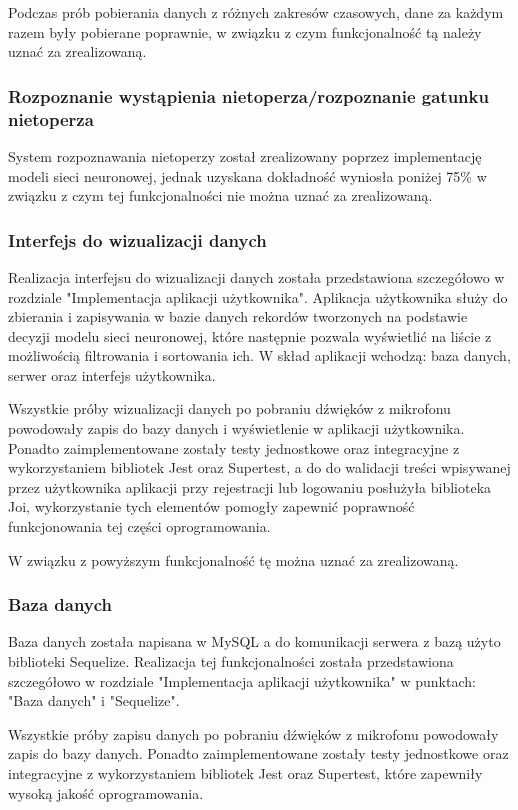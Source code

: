 \documentclass{sprz}
\begin{document}
Podczas prób pobierania danych z różnych zakresów czasowych, dane za każdym razem były pobierane poprawnie, w związku z czym funkcjonalność tą należy uznać za zrealizowaną.

\subsubsection{Rozpoznanie wystąpienia nietoperza/rozpoznanie gatunku nietoperza}
System rozpoznawania nietoperzy został zrealizowany poprzez implementację modeli sieci neuronowej, jednak uzyskana dokładność wyniosła poniżej 75\% w związku z czym tej funkcjonalności nie można uznać za zrealizowaną.


\subsubsection{Interfejs do wizualizacji danych}
Realizacja interfejsu do wizualizacji danych została przedstawiona szczegółowo w rozdziale "Implementacja aplikacji użytkownika". Aplikacja użytkownika służy do zbierania i zapisywania w bazie danych rekordów tworzonych na podstawie decyzji modelu sieci neuronowej, które następnie pozwala wyświetlić na liście z możliwością filtrowania i sortowania ich. W skład aplikacji wchodzą: baza danych, serwer oraz interfejs użytkownika. 


Wszystkie próby wizualizacji danych po pobraniu dźwięków z mikrofonu powodowały zapis do bazy danych i wyświetlenie w aplikacji użytkownika. Ponadto zaimplementowane zostały testy jednostkowe oraz integracyjne z wykorzystaniem bibliotek Jest oraz Supertest, a do do walidacji treści wpisywanej przez użytkownika aplikacji przy rejestracji lub logowaniu posłużyła biblioteka Joi, wykorzystanie tych elementów pomogły zapewnić poprawność funkcjonowania tej części oprogramowania.

W związku z powyższym funkcjonalność tę można uznać za zrealizowaną.

\subsubsection{Baza danych}
Baza danych została napisana w MySQL a do komunikacji serwera z bazą użyto biblioteki Sequelize. Realizacja tej funkcjonalności została przedstawiona szczegółowo w rozdziale "Implementacja aplikacji użytkownika" w punktach: "Baza danych" i "Sequelize". 

Wszystkie próby zapisu danych po pobraniu dźwięków z mikrofonu powodowały zapis do bazy danych. Ponadto zaimplementowane zostały testy jednostkowe oraz integracyjne z wykorzystaniem bibliotek Jest oraz Supertest, które zapewniły wysoką jakość oprogramowania.
\end{document}

